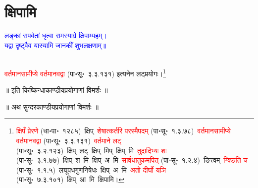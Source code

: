 \section[क्षिपामि]{क्षिपामि}
\centering\textcolor{blue}{लङ्कां सपर्वतां धृत्वा रामस्याग्रे क्षिपाम्यहम्।\nopagebreak\\
यद्वा दृष्ट्वैव यास्यामि जानकीं शुभलक्षणाम्॥}\nopagebreak\\
\\
\fontsize{14}{21}\selectfont\begin{sloppypar}\justifying\noindent\hspace{10mm} \textcolor{red}{वर्तमान\-सामीप्ये वर्तमानवद्वा} (पा॰सू॰~३.३.१३१) इत्यनेन लट्प्रयोगः।\footnote{\textcolor{red}{क्षिपँ प्रेरणे} (धा॰पा॰~१२८५)~\arrow क्षिप्~\arrow \textcolor{red}{शेषात्कर्तरि परस्मैपदम्} (पा॰सू॰~१.३.७८)~\arrow \textcolor{red}{वर्तमान\-सामीप्ये वर्तमानवद्वा} (पा॰सू॰~३.३.१३१)~\arrow \textcolor{red}{वर्तमाने लट्} (पा॰सू॰~३.२.१२३)~\arrow क्षिप्~लट्~\arrow क्षिप्~मिप्~\arrow क्षिप्~मि~\arrow \textcolor{red}{तुदादिभ्यः शः} (पा॰सू॰~३.१.७७)~\arrow क्षिप्~श~मि~\arrow क्षिप्~अ~मि~\arrow \textcolor{red}{सार्वधातुकमपित्} (पा॰सू॰~१.२.४)~\arrow ङित्त्वम्~\arrow \textcolor{red}{ग्क्ङिति च} (पा॰सू॰~१.१.५)~\arrow लघूपध\-गुण\-निषेधः~\arrow क्षिप्~अ~मि~\arrow \textcolor{red}{अतो दीर्घो यञि} (पा॰सू॰~७.३.१०१)~\arrow क्षिप्~आ~मि~\arrow क्षिपामि।}\end{sloppypar}
\vspace{2mm}
\centering ॥ इति किष्किन्धाकाण्डीयप्रयोगाणां विमर्शः ॥\nopagebreak\\
\vspace{4mm}
{}
\centering ॥ अथ सुन्दरकाण्डीयप्रयोगाणां विमर्शः ॥\nopagebreak\\
